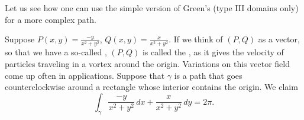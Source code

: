 Let us see how one can use the simple version of Green's (type III domains
only) for a more complex path.

\begin{example}
Suppose $P(x,y) = \frac{-y}{x^2+y^2}$, 
$Q(x,y) = \frac{x}{x^2+y^2}$.  If we think of $(P,Q)$ as a vector, so that
we have a so-called \emph{}, $(P,Q)$ is
called the \emph{}, as it gives the velocity
of particles traveling in a vortex around the origin.  Variations on this
vector field come up often in applications.
Suppose that $\gamma$ is a path that goes counterclockwise around
a rectangle whose interior contains the origin.
We claim
\begin{equation*}
\int_{\gamma} \frac{-y}{x^2+y^2} \, dx + \frac{x}{x^2+y^2} \, dy = 2 \pi .
\end{equation*}


\end{example}
